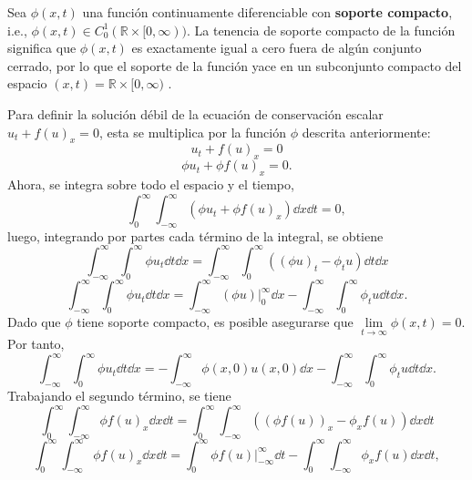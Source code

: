Sea $\phi(x,t)$ una función continuamente diferenciable con \textbf{soporte compacto}, i.e., $\phi(x,t) \in C_{0}^{1} (\mathbb{R} \times [0, \infty))$. La tenencia de soporte compacto de la función significa que $\phi(x,t)$ es exactamente igual a cero fuera de algún conjunto cerrado, por lo que el soporte de la función yace en un subconjunto compacto del espacio $(x,t) = \mathbb{R} \times [0, \infty)$ \cite{Cameron}.

Para definir la solución débil de la ecuación de conservación escalar $u_t + f(u)_x = 0$, esta se multiplica por la función $\phi$ descrita anteriormente:
\begin{equation}
	u_t + f(u)_x = 0
	\label{eq:conser-u}
\end{equation}
\begin{equation}
	\phi u_t + \phi f(u)_x = 0.
\end{equation}
Ahora, se integra sobre todo el espacio y el tiempo,
\begin{equation}
	\int_{0}^{\infty}\int_{-\infty}^{\infty}\left(\phi u_t + \phi f(u)_x\right) \dd{x}\dd{t} = 0,
\end{equation}
luego, integrando por partes cada término de la integral, se obtiene
\begin{equation}
	\int_{-\infty}^{\infty}\int_{0}^{\infty} \phi u_t \dd{t}\dd{x} = \int_{-\infty}^{\infty}\int_{0}^{\infty} \left((\phi u)_t - \phi_t u\right) \dd{t}\dd{x}
\end{equation}
\begin{equation}
	\int_{-\infty}^{\infty}\int_{0}^{\infty} \phi u_t \dd{t}\dd{x} = \int_{-\infty}^{\infty} (\phi u) \Big|_{0}^{\infty}\dd{x} - \int_{-\infty}^{\infty}\int_{0}^{\infty}\phi_t u \dd{t}\dd{x}.
\end{equation}
Dado que $\phi$ tiene soporte compacto, es posible asegurarse que $\lim\limits_{t\rightarrow \infty}\phi(x,t) = 0$. Por tanto,
\begin{equation}
	\int_{-\infty}^{\infty}\int_{0}^{\infty} \phi u_t \dd{t}\dd{x} = 
	-\int_{-\infty}^{\infty} \phi(x,0)u(x,0) \dd{x} - \int_{-\infty}^{\infty}\int_{0}^{\infty}\phi_t u \dd{t}\dd{x}.
\end{equation}
Trabajando el segundo término, se tiene
\begin{equation}
	\int_{0}^{\infty}\int_{-\infty}^{\infty}  \phi f(u)_x \dd{x}\dd{t} = 
	\int_{0}^{\infty}\int_{-\infty}^{\infty} \left((\phi f(u))_x - \phi_x f(u)\right) \dd{x}\dd{t}
\end{equation}
\begin{equation}
	\int_{0}^{\infty}\int_{-\infty}^{\infty}  \phi f(u)_x \dd{x}\dd{t} = 
	\int_{0}^{\infty} \phi f(u) \Big|_{-\infty}^{\infty} \dd{t}  - \int_{0}^{\infty}\int_{-\infty}^{\infty} \phi_x f(u) \dd{x}\dd{t},
\end{equation}
